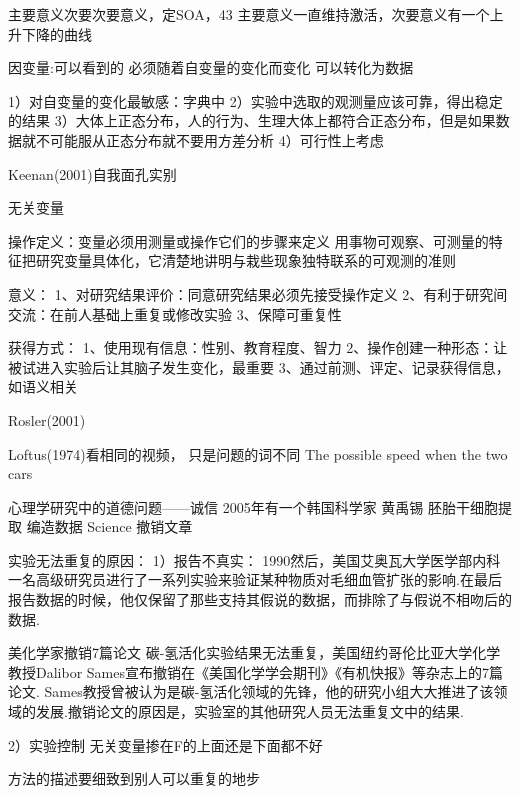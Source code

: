 主要意义次要次要意义，定SOA，43
主要意义一直维持激活，次要意义有一个上升下降的曲线


因变量:可以看到的
必须随着自变量的变化而变化
可以转化为数据

1）对自变量的变化最敏感：字典中
2）实验中选取的观测量应该可靠，得出稳定的结果
3）大体上正态分布，人的行为、生理大体上都符合正态分布，但是如果数据就不可能服从正态分布就不要用方差分析
4）可行性上考虑

Keenan(2001)自我面孔实别

无关变量

操作定义：变量必须用测量或操作它们的步骤来定义
用事物可观察、可测量的特征把研究变量具体化，它清楚地讲明与栽些现象独特联系的可观测的准则

意义：
1、对研究结果评价：同意研究结果必须先接受操作定义
2、有利于研究间交流：在前人基础上重复或修改实验
3、保障可重复性

获得方式：
1、使用现有信息：性别、教育程度、智力
2、操作创建一种形态：让被试进入实验后让其脑子发生变化，最重要
3、通过前测、评定、记录获得信息，如语义相关

Rosler(2001)

Loftus(1974)看相同的视频， 只是问题的词不同
The possible speed when the two cars

心理学研究中的道德问题——诚信
2005年有一个韩国科学家 黄禹锡 胚胎干细胞提取 编造数据 Science 撤销文章

实验无法重复的原因：
1）报告不真实：
1990然后，美国艾奥瓦大学医学部内科一名高级研究员进行了一系列实验来验证某种物质对毛细血管扩张的影响.在最后报告数据的时候，他仅保留了那些支持其假说的数据，而排除了与假说不相吻后的数据.

美化学家撤销7篇论文
碳-氢活化实验结果无法重复，美国纽约哥伦比亚大学化学教授Dalibor Sames宣布撤销在《美国化学学会期刊》《有机快报》等杂志上的7篇论文. Sames教授曾被认为是碳-氢活化领域的先锋，他的研究小组大大推进了该领域的发展.撤销论文的原因是，实验室的其他研究人员无法重复文中的结果.

2）实验控制
无关变量掺在F的上面还是下面都不好

方法的描述要细致到别人可以重复的地步








